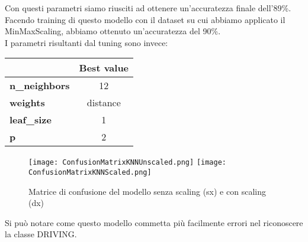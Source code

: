\documentclass[../../Report.tex]{subfiles}
\begin{document}
Con questi parametri siamo riusciti ad ottenere un'accuratezza finale dell'89\%.\\
Facendo training di questo modello con il dataset su cui abbiamo applicato il MinMaxScaling, abbiamo ottenuto un'accuratezza del 90\%.\\
I parametri risultanti dal tuning sono invece:
\begin{table}[H]
    \centering
    \begin{tabular}{|l|c|}
        \hline
         & \textbf{Best value} \\
        \hline
        \textbf{n\_neighbors} & 12 \\
        \hline
        \textbf{weights} & distance \\
        \hline
        \textbf{leaf\_size} & 1 \\
        \hline
        \textbf{p} & 2 \\
        \hline
    \end{tabular}
\end{table}

\begin{figure}[H]
    \centering
    \texttt{[image: ConfusionMatrixKNNUnscaled.png]}
    \texttt{[image: ConfusionMatrixKNNScaled.png]}
    \caption{Matrice di confusione del modello senza scaling (sx) e con scaling (dx)}
    \label{fig:confusion_matrix_KNN}
\end{figure}
Si può notare come questo modello commetta più facilmente errori nel riconoscere la classe DRIVING.\\
\end{document}
